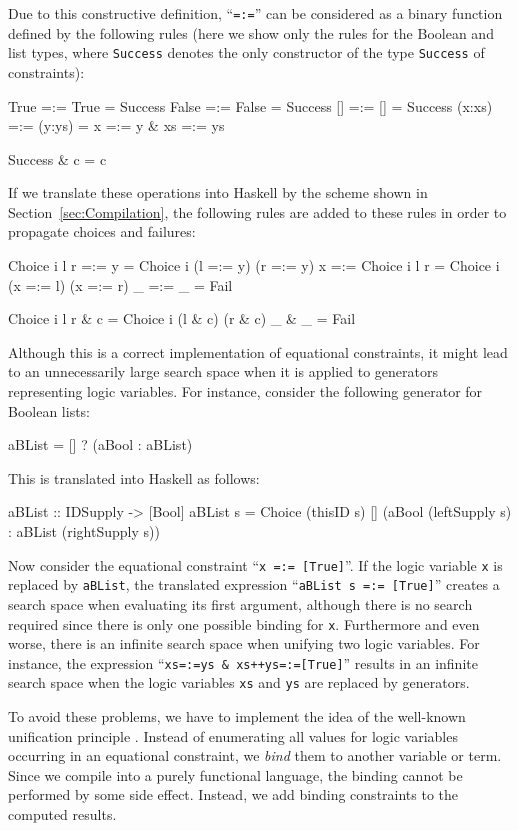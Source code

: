 \documentclass{llncs}
\newcommand{\code}[1]{\mbox{\small\texttt{#1}}}
\newcommand{\ccode}[1]{``\code{#1}''}
\begin{document}
Due to this constructive definition, \ccode{=:=}
can be considered as a binary function defined by the
following rules (here we show only the rules for the Boolean
and list types, where \code{Success} denotes the only constructor
of the type \code{Success} of constraints):
\begin{curry}
  True   =:= True    =  Success
  False  =:= False   =  Success
  []     =:= []      =  Success
  (x:xs) =:= (y:ys)  =  x =:= y & xs =:= ys

  Success & c  =  c
\end{curry}
%
If we translate these operations into Haskell by the scheme
shown in Section~\ref{sec:Compilation},
the following rules are added to these rules
in order to propagate choices and failures:
\begin{haskell}
  Choice i l r =:= y             =  Choice i (l =:= y) (r =:= y)
  x            =:= Choice i l r  =  Choice i (x =:= l) (x =:= r)
  _            =:= _             =  Fail

  Choice i l r & c  =  Choice i (l & c) (r & c)
  _            & _  =  Fail

\end{haskell}
%
Although this is a correct implementation of equational constraints,
it might lead to an unnecessarily large search space
when it is applied to generators representing logic variables.
For instance, consider the following generator for Boolean lists:
\begin{curry}
  aBList = [] ? (aBool : aBList)
\end{curry}
This is translated into Haskell as follows:
\begin{haskell}
  aBList :: IDSupply -> [Bool]
  aBList s = Choice (thisID s) [] (aBool (leftSupply s)
                                   : aBList (rightSupply s))
\end{haskell}
Now consider the equational constraint \ccode{x =:= [True]}.
If the logic variable \code{x} is replaced by \code{aBList},
the translated expression \ccode{aBList s =:= [True]}
creates a search space when evaluating its first argument,
although there is no search required since there is only one possible
binding for \code{x}.
Furthermore and even worse, there is an infinite search space
when unifying two logic variables. For instance,
the expression \ccode{xs=:=ys \& xs++ys=:=[True]}
results in an infinite search space when the logic variables
\code{xs} and \code{ys} are replaced by generators.

To avoid these problems, we have to implement the idea
of the well-known unification principle \cite{Robinson65}.
Instead of enumerating all values for logic variables
occurring in an equational constraint,
we \emph{bind} them to another variable or term.
Since we compile into a purely functional language,
the binding cannot be performed by some side effect.
Instead, we add binding constraints to the computed results.
\end{document}
